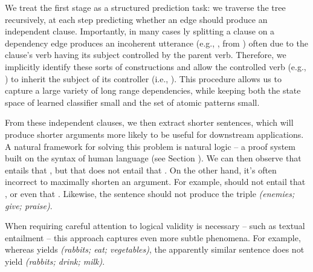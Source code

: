 We treat the first stage as a structured prediction task: we traverse
  the tree recursively, at each step predicting whether an edge should
  produce an independent clause.
Importantly, in many cases \naive ly splitting a clause on a dependency
  edge produces an incoherent utterance (e.g., ,
  from ) often due to the clause's verb having its subject 
  controlled by the parent verb.
Therefore, we implicitly identify these sorts of constructions
  and allow the controlled verb (e.g., ) to inherit the subject 
  of its controller (i.e., ).
This procedure allows us to capture a large variety of long range 
  dependencies, while keeping both the state space of learned
  classifier small and the set of atomic patterns small.
 
From these independent clauses, we then extract shorter sentences, which
  will produce shorter arguments more likely to be useful for downstream
  applications.
A natural framework for solving this problem is natural logic -- 
  a proof system built on the syntax of human language (see Section ).
We can then observe that
   entails
  that ,
  but that  does not entail that
  .
On the other hand, it's often incorrect to maximally shorten an argument.
For example,  should not entail that
  , or even that .
Likewise, the sentence  should not
  produce the triple \textit{(enemies; give; praise)}.

When requiring careful attention to logical validity is necessary -- such as 
  textual entailment -- this approach captures even more subtle phenomena.
For example, whereas  yields
  \textit{(rabbits; eat; vegetables)}, the apparently similar sentence
   does not yield
  \textit{(rabbits; drink; milk)}.

